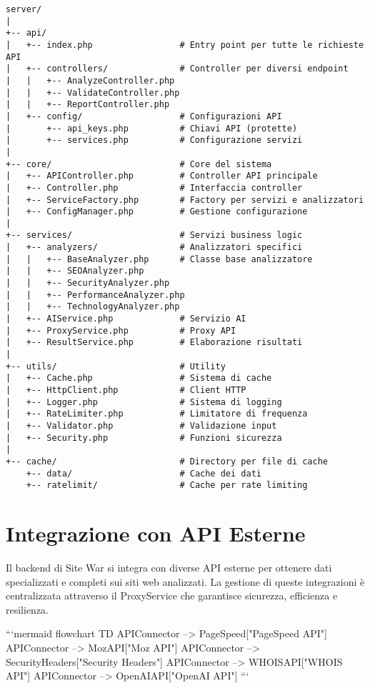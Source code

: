 \begin{verbatim}
server/
|
+-- api/
|   +-- index.php                 # Entry point per tutte le richieste API
|   +-- controllers/              # Controller per diversi endpoint
|   |   +-- AnalyzeController.php
|   |   +-- ValidateController.php
|   |   +-- ReportController.php
|   +-- config/                   # Configurazioni API
|       +-- api_keys.php          # Chiavi API (protette)
|       +-- services.php          # Configurazione servizi
|
+-- core/                         # Core del sistema
|   +-- APIController.php         # Controller API principale
|   +-- Controller.php            # Interfaccia controller
|   +-- ServiceFactory.php        # Factory per servizi e analizzatori
|   +-- ConfigManager.php         # Gestione configurazione
|
+-- services/                     # Servizi business logic
|   +-- analyzers/                # Analizzatori specifici
|   |   +-- BaseAnalyzer.php      # Classe base analizzatore
|   |   +-- SEOAnalyzer.php
|   |   +-- SecurityAnalyzer.php
|   |   +-- PerformanceAnalyzer.php
|   |   +-- TechnologyAnalyzer.php
|   +-- AIService.php             # Servizio AI
|   +-- ProxyService.php          # Proxy API
|   +-- ResultService.php         # Elaborazione risultati
|
+-- utils/                        # Utility
|   +-- Cache.php                 # Sistema di cache
|   +-- HttpClient.php            # Client HTTP
|   +-- Logger.php                # Sistema di logging
|   +-- RateLimiter.php           # Limitatore di frequenza
|   +-- Validator.php             # Validazione input
|   +-- Security.php              # Funzioni sicurezza
|
+-- cache/                        # Directory per file di cache
    +-- data/                     # Cache dei dati
    +-- ratelimit/                # Cache per rate limiting
\end{verbatim}

\section{Integrazione con API Esterne}
Il backend di Site War si integra con diverse API esterne per ottenere dati specializzati e completi sui siti web analizzati. La gestione di queste integrazioni è centralizzata attraverso il ProxyService che garantisce sicurezza, efficienza e resilienza.

```mermaid
flowchart TD
    APIConnector --> PageSpeed["PageSpeed API"]
    APIConnector --> MozAPI["Moz API"]
    APIConnector --> SecurityHeaders["Security Headers"]
    APIConnector --> WHOISAPI["WHOIS API"]
    APIConnector --> OpenAIAPI["OpenAI API"]
```


